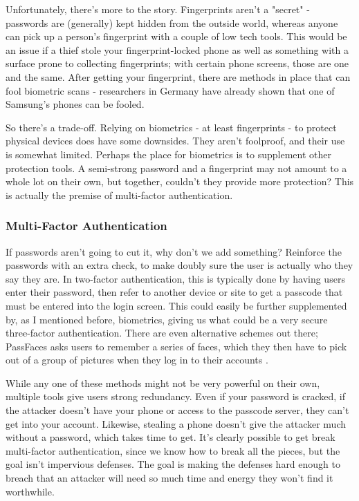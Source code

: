 \documentclass[jou]{apa6}
\begin{document}
Unfortunately, there's more to the story. Fingerprints aren't a "secret" - passwords are (generally) kept hidden from the outside world, whereas anyone can pick up a person's fingerprint with a couple of low tech tools. This would be an issue if a thief stole your fingerprint-locked phone as well as something with a surface prone to collecting fingerprints; with certain phone screens, those are one and the same. After getting your fingerprint, there are methods in place that can fool biometric scans - researchers in Germany have already shown that one of Samsung's phones can be fooled. \parencite{eadic14}

So there's a trade-off. Relying on biometrics - at least fingerprints - to protect physical devices does have some downsides. They aren't foolproof, and their use is somewhat limited. Perhaps the place for biometrics is to supplement other protection tools. A semi-strong password and a fingerprint may not amount to a whole lot on their own, but together, couldn't they provide more protection? This is actually the premise of multi-factor authentication.

\subsubsection{Multi-Factor Authentication}
If passwords aren't going to cut it, why don't we add something? Reinforce the passwords with an extra check, to make doubly sure the user is actually who they say they are. In two-factor authentication, this is typically done by having users enter their password, then refer to another device or site to get a passcode that must be entered into the login screen. This could easily be further supplemented by, as I mentioned before, biometrics, giving us what could be a very secure three-factor authentication. There are even alternative schemes out there; PassFaces asks users to remember a series of faces, which they then have to pick out of a group of pictures when they log in to their accounts \parencite{tanaka12}.

While any one of these methods might not be very powerful on their own, multiple tools give users strong redundancy. Even if your password is cracked, if the attacker doesn't have your phone or access to the passcode server, they can't get into your account. Likewise, stealing a phone doesn't give the attacker much without a password, which takes time to get. It's clearly possible to get break multi-factor authentication, since we know how to break all the pieces, but the goal isn't impervious defenses. The goal is making the defenses hard enough to breach that an attacker will need so much time and energy they won't find it worthwhile.
\end{document}
